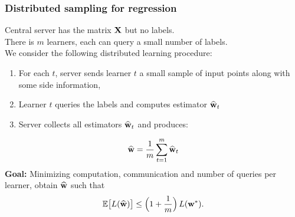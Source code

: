\documentclass{beamer}
\begin{document}

\begin{frame}
  \frametitle{Distributed sampling for regression}
  Central server has the matrix $\mathbf X$ but no labels.\\

  There is $m$ learners, each can query a small number of labels.\\[3mm]

  We consider the following distributed learning procedure:
  \begin{enumerate}
    \item For each $t$, server sends learner $t$ a small sample of
      input points along with some side information,
    \item Learner $t$ queries the labels and computes estimator $\widehat{\mathbf w}_t$
      \item Server collects all estimators $\widehat{\mathbf w}_t$ and
        produces:
  \end{enumerate}
\begin{align*}
\widehat{\mathbf w} = \frac{1}{m}\sum_{t=1}^m\widehat{\mathbf w}_t
\end{align*}
\textbf{Goal:} Minimizing computation,
communication and number of queries per learner, obtain $\widehat{\mathbf w}$ such that
\begin{align*}
\mathbb E\big[ L(\widehat{\mathbf w})\big] \leq \Big(1+\frac1m\Big)\,L(\mathbf w^*).
\end{align*}
\end{frame}
\end{document}
